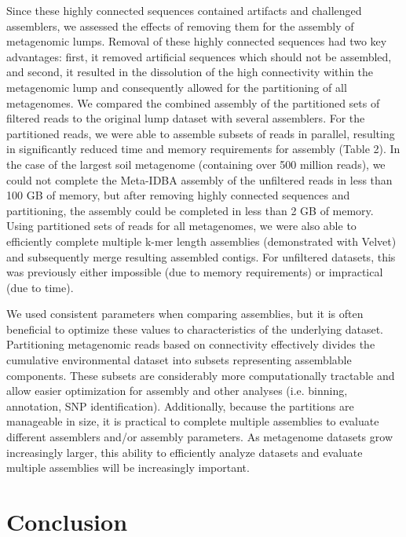 \documentclass[10pt]{article}
\begin{document}
Since these highly connected sequences contained artifacts and 
challenged assemblers,
we assessed the
effects of removing them for the assembly of metagenomic lumps.
Removal of these highly connected sequences had two key
advantages: first, it removed artificial sequences which should not be
assembled, and second, it resulted in the dissolution of the high
connectivity within the metagenomic lump and consequently allowed for
the partitioning of all metagenomes.  We compared the combined
assembly of the partitioned sets of filtered reads to the original
lump dataset with several assemblers.  For the partitioned reads, we
were able to assemble subsets of reads in parallel, resulting in
significantly reduced time and memory requirements for assembly (Table
2).  In the case of the largest soil metagenome (containing over 500
million reads), we could not complete the Meta-IDBA assembly of the
unfiltered reads in less than 100 GB of memory, but after removing
highly connected sequences and partitioning, the assembly could be
completed in less than 2 GB of memory.  Using partitioned sets of
reads for all metagenomes, we were also able to efficiently complete
multiple k-mer length assemblies (demonstrated with Velvet) and
subsequently merge resulting assembled contigs.  For unfiltered
datasets, this was previously either impossible (due to memory
requirements) or impractical (due to time).

We used consistent parameters when comparing assemblies, but it is often
beneficial to optimize these values to characteristics of the
underlying dataset.  Partitioning metagenomic reads based on
connectivity effectively divides the cumulative environmental dataset
into subsets representing assemblable components.  These subsets are
considerably more computationally tractable and allow easier
optimization for assembly and other analyses (i.e. binning,
annotation, SNP identification).  Additionally, because the partitions
are manageable in size, it is practical to complete multiple
assemblies to evaluate different assemblers and/or assembly
parameters.  As metagenome datasets grow increasingly larger, this
ability to efficiently analyze datasets and evaluate multiple
assemblies will be increasingly important.

\section*{Conclusion}

\end{document}
